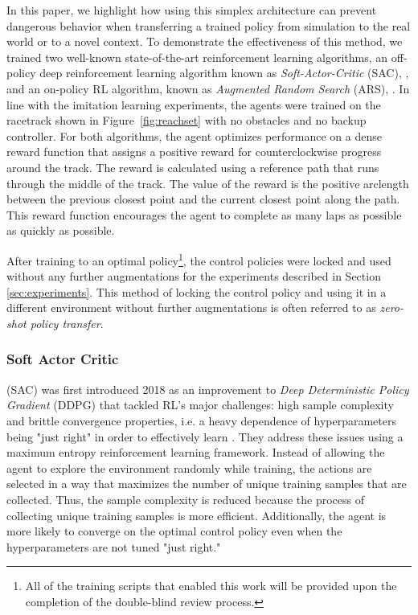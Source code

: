 \documentclass[manuscript,screen,review]{acmart}
\newcommand{\figref}[1]{Figure~\ref{#1}}
\begin{document}
In this paper, we highlight how using this simplex architecture can prevent dangerous behavior when transferring a trained policy from simulation to the real world or to a novel context.
To demonstrate the effectiveness of this method, we trained two well-known state-of-the-art reinforcement learning algorithms, an off-policy deep reinforcement learning algorithm known as \emph{Soft-Actor-Critic} (SAC), \cite{haarnoja2018soft}, and an on-policy RL algorithm, known as \emph{Augmented Random Search} (ARS), \cite{mania2018simple}. %
In line with the imitation learning experiments, the agents were trained on the racetrack shown in \figref{fig:reachset} with no obstacles and no backup controller. For both algorithms, the agent optimizes performance on a dense reward function that assigns a positive reward for counterclockwise progress around the track. The reward is calculated using a reference path that runs through the middle of the track. The value of the reward is the positive arclength between the previous closest point and the current closest point along the path. This reward function encourages the agent to complete as many laps as possible as quickly as possible.

After training to an optimal policy\footnote{All of the training scripts that enabled this work will be provided upon the completion of the double-blind review process.}, the control policies were locked and used without any further augmentations for the experiments described in Section \ref{sec:experiments}. This method of locking the control policy and using it in a different environment without further augmentations is often referred to as \emph{zero-shot policy transfer}.


\subsubsection{Soft Actor Critic}
(SAC) was first introduced 2018 as an improvement to \emph{Deep Deterministic Policy Gradient} (DDPG) that tackled RL's major challenges: high sample complexity and brittle convergence properties, i.e. a heavy dependence of hyperparameters being "just right" in order to effectively learn \cite{haarnoja2018soft}. They address these issues using a maximum entropy reinforcement learning framework. Instead of allowing the agent to explore the environment randomly while training, the actions are selected in a way that maximizes the number of unique training samples that are collected. Thus, the sample complexity is reduced because the process of collecting unique training samples is more efficient. Additionally, the agent is more likely to converge on the optimal control policy even when the hyperparameters are not tuned "just right."
\end{document}
